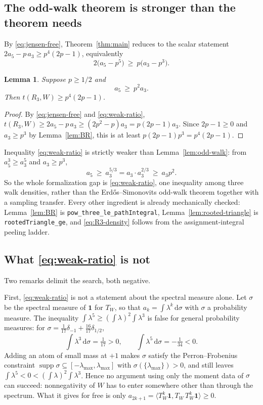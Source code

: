 \documentclass[11pt]{article}
\newtheorem{lemma}[theorem]{Lemma}
\newcommand{\dd}{\,\mathrm d}
\begin{document}
\subsection{The odd-walk theorem is stronger than the theorem needs}

By \eqref{eq:jensen-free}, Theorem~\ref{thm:main} reduces to the scalar
statement $2a_5-p\,a_3\geq p^4(2p-1)$, equivalently
\begin{equation}
 2\bigl(a_5-p^5\bigr)\ \geq\ p\bigl(a_3-p^3\bigr).
 \label{eq:defect}
\end{equation}

\begin{lemma}
\label{lem:reduction}
Suppose $p\geq1/2$ and
\begin{equation}
 a_5\ \geq\ p^2a_3 .
 \label{eq:weak-ratio}
\end{equation}
Then $t(R_3,W)\geq p^4(2p-1)$.
\end{lemma}

\begin{proof}
By \eqref{eq:jensen-free} and \eqref{eq:weak-ratio},
$t(R_3,W)\geq2a_5-p\,a_3\geq(2p^2-p)a_3=p(2p-1)a_3$.
Since $2p-1\geq0$ and $a_3\geq p^3$ by Lemma~\ref{lem:BR}, this is at least
$p(2p-1)p^3=p^4(2p-1)$.
\end{proof}

Inequality \eqref{eq:weak-ratio} is strictly weaker than
Lemma~\ref{lem:odd-walk}: from $a_5^3\geq a_3^5$ and $a_3\geq p^3$,
\[
 a_5\ \geq\ a_3^{5/3}=a_3\cdot a_3^{2/3}\ \geq\ a_3p^2 .
\]
So the whole formalization gap is \eqref{eq:weak-ratio}, one inequality among
three walk densities, rather than the Erd\H{o}s--Simonovits odd-walk theorem
together with a sampling transfer.  Every other ingredient is already
mechanically checked: Lemma~\ref{lem:BR} is \texttt{pow\_three\_le\_pathIntegral},
Lemma~\ref{lem:rooted-triangle} is \texttt{rootedTriangle\_ge}, and
\eqref{eq:R3-density} follows from the assignment-integral peeling ladder.

\subsection{What \eqref{eq:weak-ratio} is not}

Two remarks delimit the search, both negative.

First, \eqref{eq:weak-ratio} is not a statement about the spectral measure
alone.  Let $\sigma$ be the spectral measure of $\mathbf1$ for $T_W$, so that
$a_k=\int\lambda^k\dd\sigma$ with $\sigma$ a probability measure.  The
inequality $\int\lambda^5\geq(\int\lambda)^2\int\lambda^3$ is false for general
probability measures: for
$\sigma=\tfrac1{17}\delta_{-1}+\tfrac{16}{17}\delta_{1/2}$,
\[
 \int\lambda^3\dd\sigma=\tfrac1{17}>0,
 \qquad
 \int\lambda^5\dd\sigma=-\tfrac1{34}<0 .
\]
Adding an atom of small mass at $+1$ makes $\sigma$ satisfy the
Perron--Frobenius constraint
$\operatorname{supp}\sigma\subseteq[-\lambda_{\max},\lambda_{\max}]$ with
$\sigma(\{\lambda_{\max}\})>0$, and still leaves
$\int\lambda^5<0<(\int\lambda)^2\int\lambda^3$.  Hence no argument using only
the moment data of $\sigma$ can succeed: nonnegativity of $W$ has to enter
somewhere other than through the spectrum.  What it gives for free is only
$a_{2k+1}=\langle T_W^k\mathbf1,T_W\,T_W^k\mathbf1\rangle\geq0$.
\end{document}
